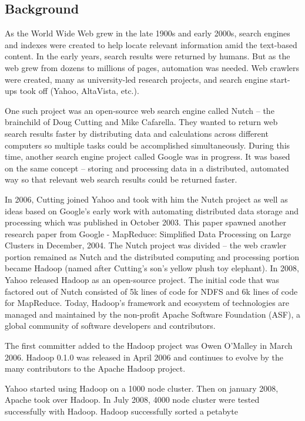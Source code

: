 \documentclass[a4paper,12pt,oneside]{report}
\begin{document}
\subsection{Background}
As the World Wide Web grew in the late 1900s and early 2000s, search engines and indexes were created to help locate relevant information amid the text-based content. In the early years, search results were returned by humans. But as the web grew from dozens to millions of pages, automation was needed. Web crawlers were created, many as university-led research projects, and search engine start-ups took off (Yahoo, AltaVista, etc.).
\par One such project was an open-source web search engine called Nutch – the brainchild of Doug Cutting and Mike Cafarella. They wanted to return web search results faster by distributing data and calculations across different computers so multiple tasks could be accomplished simultaneously. During this time, another search engine project called Google was in progress. It was based on the same concept – storing and processing data in a distributed, automated way so that relevant web search results could be returned faster.
\par In 2006, Cutting joined Yahoo and took with him the Nutch project as well as ideas based on Google’s early work with automating distributed data storage and processing which was published in October 2003. This paper spawned another research paper from Google - MapReduce: Simplified Data Processing on Large Clusters in December, 2004. The Nutch project was divided – the web crawler portion remained as Nutch and the distributed computing and processing portion became Hadoop (named after Cutting’s son’s yellow plush toy elephant). In 2008, Yahoo released Hadoop as an open-source project. The initial code that was factored out of Nutch consisted of 5k lines of code for NDFS and 6k lines of code for MapReduce. Today, Hadoop’s framework and ecosystem of technologies are managed and maintained by the non-profit Apache Software Foundation (ASF), a global community of software developers and contributors.
\par The first committer added to the Hadoop project was Owen O’Malley in March 2006. Hadoop 0.1.0 was released in April 2006 and continues to evolve by the many contributors to the Apache Hadoop project.
\par Yahoo started using Hadoop on a 1000 node cluster. Then on january 2008, Apache took over Hadoop. In July 2008, 4000 node cluster were tested successfully with Hadoop. Hadoop successfully sorted a petabyte
\end{document}
